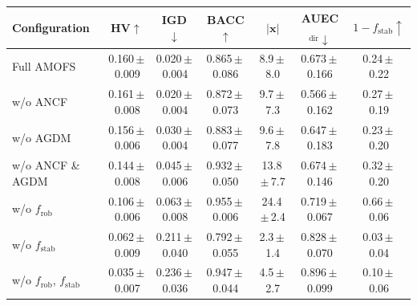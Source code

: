 \begin{tabular}{lcccccc}
\toprule
Configuration & HV$\uparrow$ & IGD$\downarrow$ & BACC$\uparrow$ & $|\mathbf{x}|$ & AUEC$_{\mathrm{dir}}\downarrow$ & $1-f_{\mathrm{stab}}\uparrow$ \\
\midrule
Full AMOFS & 0.160\,$\pm$\,0.009 & 0.020\,$\pm$\,0.004 & 0.865\,$\pm$\,0.086 & 8.9\,$\pm$\,8.0 & 0.673\,$\pm$\,0.166 & 0.24\,$\pm$\,0.22 \\
w/o ANCF & 0.161\,$\pm$\,0.008 & 0.020\,$\pm$\,0.004 & 0.872\,$\pm$\,0.073 & 9.7\,$\pm$\,7.3 & 0.566\,$\pm$\,0.162 & 0.27\,$\pm$\,0.19 \\
w/o AGDM & 0.156\,$\pm$\,0.006 & 0.030\,$\pm$\,0.004 & 0.883\,$\pm$\,0.077 & 9.6\,$\pm$\,7.8 & 0.647\,$\pm$\,0.183 & 0.23\,$\pm$\,0.20 \\
w/o ANCF \& AGDM & 0.144\,$\pm$\,0.008 & 0.045\,$\pm$\,0.006 & 0.932\,$\pm$\,0.050 & 13.8\,$\pm$\,7.7 & 0.674\,$\pm$\,0.146 & 0.32\,$\pm$\,0.20 \\
w/o $f_{\mathrm{rob}}$ & 0.106\,$\pm$\,0.006 & 0.063\,$\pm$\,0.008 & 0.955\,$\pm$\,0.006 & 24.4\,$\pm$\,2.4 & 0.719\,$\pm$\,0.067 & 0.66\,$\pm$\,0.06 \\
w/o $f_{\mathrm{stab}}$ & 0.062\,$\pm$\,0.009 & 0.211\,$\pm$\,0.040 & 0.792\,$\pm$\,0.055 & 2.3\,$\pm$\,1.4 & 0.828\,$\pm$\,0.070 & 0.03\,$\pm$\,0.04 \\
w/o $f_{\mathrm{rob}}$, $f_{\mathrm{stab}}$ & 0.035\,$\pm$\,0.007 & 0.236\,$\pm$\,0.036 & 0.947\,$\pm$\,0.044 & 4.5\,$\pm$\,2.7 & 0.896\,$\pm$\,0.099 & 0.10\,$\pm$\,0.06 \\
\bottomrule
\end{tabular}
